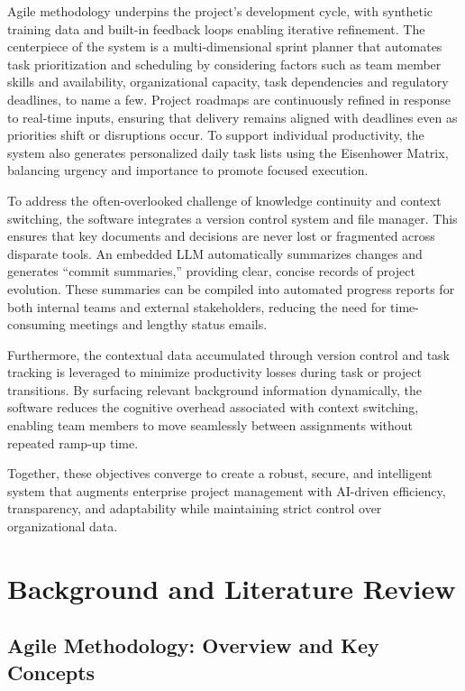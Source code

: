 \documentclass[12pt,a4paper]{report}
\begin{document}
Agile methodology underpins the project’s development cycle, with synthetic training data and built-in feedback loops enabling iterative refinement. The centerpiece of the system is a multi-dimensional sprint planner that automates task prioritization and scheduling by considering factors such as team member skills and availability, organizational capacity, task dependencies and regulatory deadlines, to name a few. Project roadmaps are continuously refined in response to real-time inputs, ensuring that delivery remains aligned with deadlines even as priorities shift or disruptions occur. To support individual productivity, the system also generates personalized daily task lists using the Eisenhower Matrix, balancing urgency and importance to promote focused execution.

To address the often-overlooked challenge of knowledge continuity and context switching, the software integrates a version control system and file manager. This ensures that key documents and decisions are never lost or fragmented across disparate tools. An embedded LLM automatically summarizes changes and generates “commit summaries,” providing clear, concise records of project evolution. These summaries can be compiled into automated progress reports for both internal teams and external stakeholders, reducing the need for time-consuming meetings and lengthy status emails.

Furthermore, the contextual data accumulated through version control and task tracking is leveraged to minimize productivity losses during task or project transitions. By surfacing relevant background information dynamically, the software reduces the cognitive overhead associated with context switching, enabling team members to move seamlessly between assignments without repeated ramp-up time.

Together, these objectives converge to create a robust, secure, and intelligent system that augments enterprise project management with AI-driven efficiency, transparency, and adaptability while maintaining strict control over organizational data.

\chapter{Background and Literature Review}  %
\section{Agile Methodology: Overview and Key Concepts}
\end{document}
